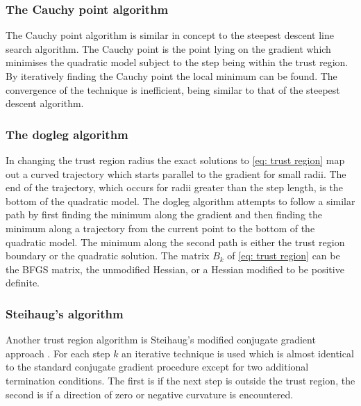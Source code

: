 \subsubsection{The Cauchy point algorithm}

The Cauchy point algorithm is similar in concept to the steepest descent line search algorithm.  The Cauchy point is the point lying on the gradient which minimises the quadratic model subject to the step being within the trust region.  By iteratively finding the Cauchy point the local minimum can be found.  The convergence of the technique is inefficient, being similar to that of the steepest descent algorithm.


\subsubsection{The dogleg algorithm}

In changing the trust region radius the exact solutions to \eqref{eq: trust region} map out a curved trajectory which starts parallel to the gradient for small radii.  The end of the trajectory, which occurs for radii greater than the step length, is the bottom of the quadratic model.  The dogleg algorithm attempts to follow a similar path by first finding the minimum along the gradient and then finding the minimum along a trajectory from the current point to the bottom of the quadratic model.  The minimum along the second path is either the trust region boundary or the quadratic solution.  The matrix $B_k$ of \eqref{eq: trust region} can be the BFGS matrix, the unmodified Hessian, or a Hessian modified to be positive definite.


\subsubsection{Steihaug's algorithm}

Another trust region algorithm is Steihaug's modified conjugate gradient approach \citep{Steihaug83}.  For each step $k$ an iterative technique is used which is almost identical to the standard conjugate gradient procedure except for two additional termination conditions.  The first is if the next step is outside the trust region, the second is if a direction of zero or negative curvature is encountered.


